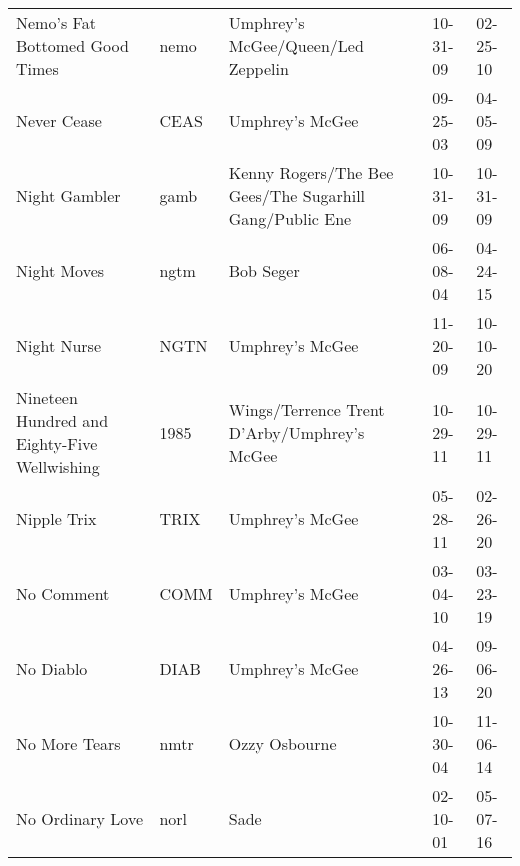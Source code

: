 \begin{longtable}{p{}p{}p{}p{}p{}}
                                          Nemo's Fat Bottomed Good Times &          nemo &                       Umphrey's McGee/Queen/Led Zeppelin &              10-31-09 &             02-25-10 \\
                                                             Never Cease &          CEAS &                                          Umphrey's McGee &              09-25-03 &             04-05-09 \\
                                                           Night Gambler &          gamb &  Kenny Rogers/The Bee Gees/The Sugarhill Gang/Public Ene &              10-31-09 &             10-31-09 \\
                                                             Night Moves &          ngtm &                                                Bob Seger &              06-08-04 &             04-24-15 \\
                                                             Night Nurse &          NGTN &                                          Umphrey's McGee &              11-20-09 &             10-10-20 \\
                            Nineteen Hundred and Eighty-Five Wellwishing &          1985 &              Wings/Terrence Trent D'Arby/Umphrey's McGee &              10-29-11 &             10-29-11 \\
                                                             Nipple Trix &          TRIX &                                          Umphrey's McGee &              05-28-11 &             02-26-20 \\
                                                              No Comment &          COMM &                                          Umphrey's McGee &              03-04-10 &             03-23-19 \\
                                                               No Diablo &          DIAB &                                          Umphrey's McGee &              04-26-13 &             09-06-20 \\
                                                           No More Tears &          nmtr &                                            Ozzy Osbourne &              10-30-04 &             11-06-14 \\
                                                        No Ordinary Love &          norl &                                                     Sade &              02-10-01 &             05-07-16 \\

\end{longtable}
